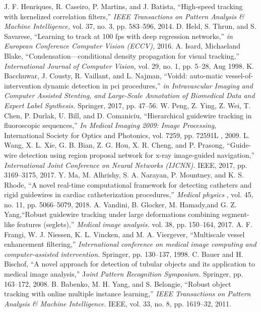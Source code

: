\documentclass[letterpaper, 10 pt, conference]{ieeeconf}  %
\begin{document}
\begin{thebibliography}{99}

 J. F. Henriques, R. Caseiro, P. Martins, and J. Batista, “High-speed tracking with kernelized correlation filters,” \emph{IEEE Transactions on Pattern Analysis & Machine Intelligence,} vol. 37, no. 3, pp. 583–596, 2014.
 D. Held, S. Thrun, and S. Savarese, “Learning to track at 100 fps with deep regression networks,” \emph{in European Conference Computer Vision (ECCV),} 2016.
 A. Isard, Michaeland Blake, “Condensation—conditional density propagation for visual tracking,” \emph{International Journal of Computer Vision,} vol. 29, no. 1, pp. 5–28, Aug 1998. 
 K. Bacchuwar, J. Cousty, R. Vaillant, and L. Najman, “Voidd: auto-matic vessel-of-intervention dynamic detection in pci procedures,”  \emph{in Intravascular Imaging and Computer Assisted Stenting, and Large-Scale Annotation of Biomedical Data and Expert Label Synthesis.}  Springer, 2017, pp. 47–56.
 W. Peng, Z. Ying, Z. Wei, T. Chen, P. Durlak, U. Bill, and D. Comaniciu, “Hierarchical guidewire tracking in fluoroscopic sequences,”  \emph{In Medical Imaging 2009: Image Processing, } International Society for Optics and Photonics, vol. 7259, pp. 72591L , 2009.
 L. Wang, X. L. Xie, G. B. Bian, Z. G. Hou, X. R. Cheng, and P. Prasong, “Guide-wire detection using region proposal network for x-ray image-guided navigation,”  \emph{International Joint Conference on Neural Networks (IJCNN). } IEEE, 2017, pp. 3169–3175, 2017.
 Y. Ma, M. Alhrishy, S. A. Narayan, P. Mountney, and K. S. Rhode, “A novel real-time computational framework for detecting catheters and rigid guidewires in cardiac catheterization procedures,” \emph{ Medical physics }, vol. 45, no. 11, pp. 5066–5079, 2018.
 A. Vandini, B. Glocker, M. Hamady,and G. Z. Yang,“Robust guidewire tracking under large deformations combining segment-like features (seglets),” \emph{Medical image analysis. } vol. 38, pp. 150–164, 2017.
 A. F. Frangi, W. J. Niessen, K. L. Vincken, and M. A. Viergever, “Multiscale vessel enhancement filtering,” \emph{International conference on medical image computing and computer-assisted intervention.} Springer,  pp. 130–137, 1998.
 C. Bauer and H. Bischof, “A novel approach for detection of tubular objects and its application to medical image analysis,”  J\emph{oint Pattern Recognition Symposium.}  Springer,  pp. 163–172, 2008.
 B. Babenko, M. H. Yang, and S. Belongie, “Robust object tracking with online multiple instance learning,”  \emph{ IEEE Transactions on Pattern Analysis & Machine Intelligence. } IEEE, vol. 33, no. 8, pp. 1619–32, 2011.

\end{thebibliography}
\end{document}
